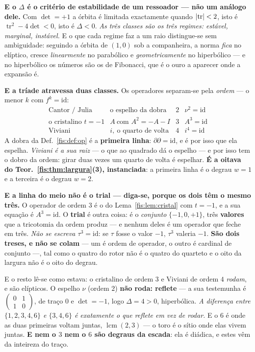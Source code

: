 \documentclass[livro.tex]{subfiles}
\begin{document}
\medskip\noindent\textbf{E o $\Delta$ é o critério de estabilidade de um
ressoador --- não um análogo dele.} Com $\det=+1$ a órbita é limitada exactamente
quando $\lvert \operatorname{tr}\rvert<2$, isto é $\operatorname{tr}^{2}-4\det<0$, isto é
$\Delta<0$. \emph{As três classes são os três regimes: estável, marginal,
instável.} E o que cada regime faz a um raio distingue-se sem ambiguidade:
seguindo a órbita de $(1,0)$ sob a companheira, a norma \emph{fica} no elíptico,
cresce \emph{linearmente} no parabólico e \emph{geometricamente} no hiperbólico
--- e no hiperbólico os números são os de Fibonacci, que é o ouro a aparecer onde
a expansão é.

\medskip\noindent\textbf{E a tríade atravessa duas classes.} Os operadores
separam-se pela \emph{ordem} --- o menor $k$ com $f^{k}=\mathrm{id}$:
\[
\begin{array}{llcl}
\text{Cantor / Julia} & \text{o espelho da dobra} & 2 & \nu^{2}=\mathrm{id}\\
\text{o cristalino } t=-1 & A\ \text{com } A^{2}=-A-I & 3 & A^{3}=\mathrm{id}\\
\text{Viviani} & i,\ \text{o quarto de volta} & 4 & i^{4}=\mathrm{id}
\end{array}
\]
A dobra da Def.~\ref{fis:def:op} é a \textbf{primeira linha}: $\partial\partial=
\mathrm{id}$, e é por isso que ela espelha. \emph{Viviani é a sua raiz} --- o que
ao quadrado dá o espelho --- e por isso tem o dobro da ordem: girar duas vezes um
quarto de volta é espelhar. \textbf{É a oitava do Teor.~\ref{fis:thm:largura}(3),
instanciada}: a primeira linha é o degrau $w=1$ e a terceira é o degrau $w=2$.

\medskip\noindent\textbf{E a linha do meio não é o trial --- diga-se, porque os
dois têm o mesmo três.} O operador de ordem $3$ é o do
Lema~\ref{fis:lem:cristal} com $t=-1$, e a sua equação é $A^{3}=\mathrm{id}$. O
\textbf{trial} é outra coisa: é o \emph{conjunto} $\{-1,0,+1\}$, três
\textbf{valores} que a tricotomia da ordem produz --- e nenhum deles é um
operador que feche em três. \emph{Não se escreva $\tau^{3}=\mathrm{id}$}: se
$\tau$ fosse o valor $-1$, $\tau^{3}$ valeria $-1$. \textbf{São dois treses, e
não se colam} --- um é ordem de operador, o outro é cardinal de conjunto ---, tal
como o quatro do rotor não é o quatro do quarteto e o oito da largura não é o
oito do degrau.

\medskip\noindent E o resto lê-se como estava: o cristalino de ordem $3$ e
Viviani de ordem $4$ \emph{rodam}, e são elípticos. O espelho $\nu$ (ordem $2$)
\textbf{não roda: reflete} --- a sua testemunha é
$\left(\begin{smallmatrix}0&1\\1&0\end{smallmatrix}\right)$, de traço $0$ e
$\det=-1$, logo $\Delta=4>0$, hiperbólica. \emph{A diferença entre
$\{1,2,3,4,6\}$ e $\{3,4,6\}$ é exatamente o que reflete em vez de rodar.} E o
$6$ é onde as duas primeiras voltam juntas, $\operatorname{lcm}(2,3)$ --- o toro é
o sítio onde elas vivem juntas. \textbf{E nem o $3$ nem o $6$ são degraus da
escada}: ela é diádica, e estes vêm da inteireza do traço.
\end{document}
